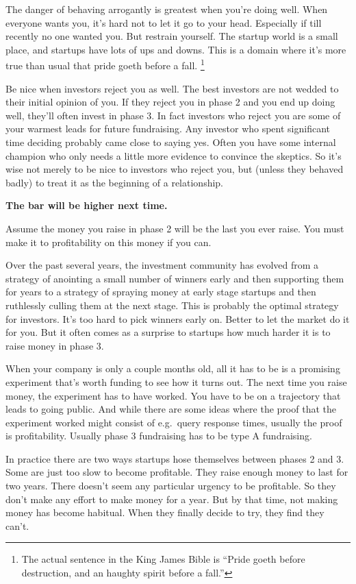 The danger of behaving arrogantly is greatest when you're doing well.
When everyone wants you, it's hard not to let it go to your head.
Especially if till recently no one wanted you. But restrain yourself.
The startup world is a small place, and startups have lots of ups and
downs. This is a domain where it's more true than usual that pride goeth
before a fall. \footnote{The actual sentence in the King James Bible is ``Pride goeth
before destruction, and an haughty spirit before a fall.''}

Be nice when investors reject you as well. The best investors are not
wedded to their initial opinion of you. If they reject you in phase 2
and you end up doing well, they'll often invest in phase 3. In fact
investors who reject you are some of your warmest leads for future
fundraising. Any investor who spent significant time deciding probably
came close to saying yes. Often you have some internal champion who only
needs a little more evidence to convince the skeptics. So it's wise not
merely to be nice to investors who reject you, but (unless they behaved
badly) to treat it as the beginning of a relationship.

\textbf{The bar will be higher next time.}

Assume the money you raise in phase 2 will be the last you ever raise.
You must make it to profitability on this money if you can.

Over the past several years, the investment community has evolved from a
strategy of anointing a small number of winners early and then
supporting them for years to a strategy of spraying money at early stage
startups and then ruthlessly culling them at the next stage. This is
probably the optimal strategy for investors. It's too hard to pick
winners early on. Better to let the market do it for you. But it often
comes as a surprise to startups how much harder it is to raise money in
phase 3.

When your company is only a couple months old, all it has to be is a
promising experiment that's worth funding to see how it turns out. The
next time you raise money, the experiment has to have worked. You have
to be on a trajectory that leads to going public. And while there are
some ideas where the proof that the experiment worked might consist of
e.g.~query response times, usually the proof is profitability. Usually
phase 3 fundraising has to be type A fundraising.

In practice there are two ways startups hose themselves between phases 2
and 3. Some are just too slow to become profitable. They raise enough
money to last for two years. There doesn't seem any particular urgency
to be profitable. So they don't make any effort to make money for a
year. But by that time, not making money has become habitual. When they
finally decide to try, they find they can't.

